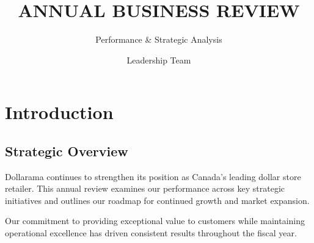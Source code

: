 \documentclass{dollarama}
\title{ANNUAL BUSINESS REVIEW}
\subtitle{Performance \& Strategic Analysis}
\author{Leadership Team}
\begin{document}
\maketitle


\tableofcontents
\clearpage



\section{Introduction}

\subsection{Strategic Overview}

Dollarama continues to strengthen its position as Canada's leading dollar store retailer. This annual review examines our performance across key strategic initiatives and outlines our roadmap for continued growth and market expansion.

Our commitment to providing exceptional value to customers while maintaining operational excellence has driven consistent results throughout the fiscal year.


\clearpage


\end{document}
